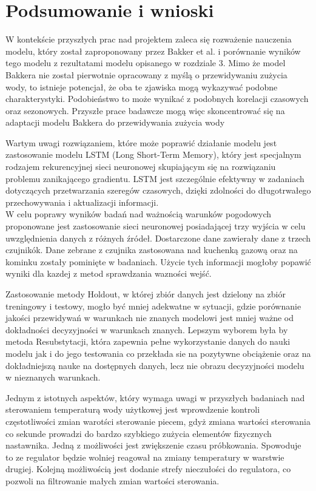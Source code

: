 \documentclass[a4paper,twoside,12pt]{book}
\begin{document}
\chapter{Podsumowanie i wnioski}

W kontekście przyszłych prac nad projektem zaleca się rozważenie nauczenia modelu, który został zaproponowany przez Bakker et al. i porównanie wyników tego modelu z rezultatami modelu opisanego w rozdziale 3. Mimo że model Bakkera nie został pierwotnie opracowany z myślą o przewidywaniu zużycia wody, to istnieje potencjał, że oba te zjawiska mogą wykazywać podobne charakterystyki. Podobieństwo to może wynikać z podobnych korelacji czasowych oraz sezonowych. Przyszłe prace badawcze mogą więc skoncentrować się na adaptacji modelu Bakkera do przewidywania zużycia wody

Wartym uwagi rozwiązaniem, które może poprawić działanie modelu jest zastosowanie modelu LSTM (Long Short-Term Memory), który jest specjalnym rodzajem rekurencyjnej sieci neuronowej skupiającym się na rozwiązaniu problemu zanikającego gradientu. LSTM jest szczególnie efektywny w zadaniach dotyczących przetwarzania szeregów czasowych, dzięki zdolności do długotrwałego przechowywania i aktualizacji informacji.\\


W celu poprawy wyników badań nad ważnością warunków pogodowych proponowane jest zastosowanie sieci neuronowej posiadającej trzy wyjścia w celu uwzględnienia danych z różnych źródeł. Dostarczone dane zawierały dane z trzech czujnikók. Dane zebrane z czujnika zastosowana nad kuchenką gazową oraz na kominku zostały pominięte w badaniach. Użycie tych informacji mogłoby popawić wyniki dla kazdej z metod sprawdzania wazności wejść.

Zastosowanie metody Holdout, w której zbiór danych jest dzielony na zbiór treningowy i testowy, mogło być mniej adekwatne w sytuacji, gdzie porównanie jakości przewidywań w warunkach nie znanych modelowi jest mniej ważne od dokładności decyzyjności w warunkach znanych. Lepszym wyborem była by metoda Resubstytacji, która zapewnia pełne wykorzystanie danych do nauki modelu jak i do jego testowania co przekłada sie na pozytywne obciążenie oraz na dokładniejszą nauke na dostępnych danych, lecz nie obrazu decyzyjności modelu w nieznanych warunkach.

\newpage
Jednym z istotnych aspektów, który wymaga uwagi w przyszłych badaniach nad sterowaniem temperaturą wody użytkowej jest wprowdzenie kontroli częstotliwości zmian warotści sterowanie piecem, gdyż zmiana wartości sterowania co sekunde prowadzi do bardzo szybkiego zużycia elementów fizycznych nastawnika. Jedną z możliwości jest zwiększenie czasu próbkowania. Spowoduje to ze regulator będzie wolniej reagował na zmiany temperatury w warstwie drugiej. Kolejną możliwością jest dodanie strefy nieczułości do regulatora, co pozwoli na filtrowanie małych zmian wartości sterowania.
\end{document}
